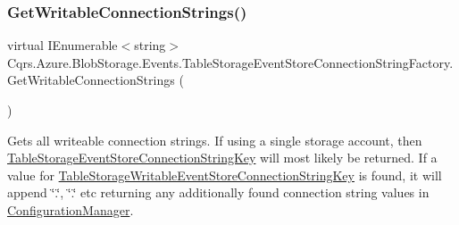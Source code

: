 \mbox{\label{classCqrs_1_1Azure_1_1BlobStorage_1_1Events_1_1TableStorageEventStoreConnectionStringFactory_a07406c2607bdd42dd13116b92fc6b665_a07406c2607bdd42dd13116b92fc6b665}} 
\subsubsection{\texorpdfstring{Get\+Writable\+Connection\+Strings()}{GetWritableConnectionStrings()}}
{\footnotesize\ttfamily virtual I\+Enumerable$<$string$>$ Cqrs.\+Azure.\+Blob\+Storage.\+Events.\+Table\+Storage\+Event\+Store\+Connection\+String\+Factory.\+Get\+Writable\+Connection\+Strings (\begin{DoxyParamCaption}{ }\end{DoxyParamCaption})\hspace{0.3cm}{\ttfamily [virtual]}}



Gets all writeable connection strings. If using a single storage account, then \hyperlink{classCqrs_1_1Azure_1_1BlobStorage_1_1Events_1_1TableStorageEventStoreConnectionStringFactory_a95f8662029c8a40117e326973de936bf_a95f8662029c8a40117e326973de936bf}{Table\+Storage\+Event\+Store\+Connection\+String\+Key} will most likely be returned. If a value for \hyperlink{classCqrs_1_1Azure_1_1BlobStorage_1_1Events_1_1TableStorageEventStoreConnectionStringFactory_a73df7618d5978a2c0d2e69880b799369_a73df7618d5978a2c0d2e69880b799369}{Table\+Storage\+Writable\+Event\+Store\+Connection\+String\+Key} is found, it will append \char`\"{}.\char`\"{}, \char`\"{}.\char`\"{} etc returning any additionally found connection string values in \hyperlink{namespaceCqrs_1_1Azure_1_1ConfigurationManager}{Configuration\+Manager}. 




